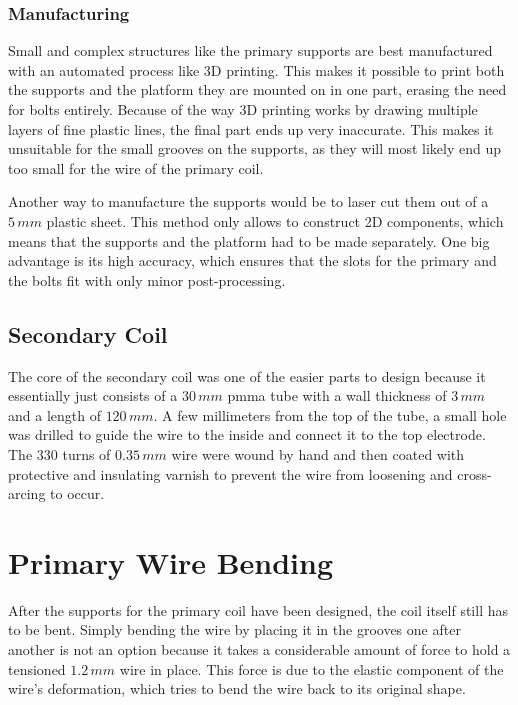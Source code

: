 \subsubsection{Manufacturing}

Small and complex structures like the primary supports are best manufactured with an automated process like 3D printing. This makes it possible to print both the supports and the platform they are mounted on in one part, erasing the need for bolts entirely. Because of the way 3D printing works by drawing multiple layers of fine plastic lines, the final part ends up very inaccurate. This makes it unsuitable for the small grooves on the supports, as they will most likely end up too small for the wire of the primary coil. 

Another way to manufacture the supports would be to laser cut them out of a \(5\,mm\) plastic sheet. This method only allows to construct 2D components, which means that the supports and the platform had to be made separately. One big advantage is its high accuracy, which ensures that the slots for the primary and the bolts fit with only minor post-processing. 

\subsection{Secondary Coil}

The core of the secondary coil was one of the easier parts to design because it essentially just consists of a \(30\,mm\) \gls{pmma} tube with a wall thickness of \(3\,mm\) and a length of \(120\,mm\). A few millimeters from the top of the tube, a small hole was drilled to guide the wire to the inside and connect it to the top electrode. The \(330\) turns of \(0.35\,mm\) wire were wound by hand and then coated with protective and insulating varnish to prevent the wire from loosening and cross-arcing to occur.

\section{Primary Wire Bending}

After the supports for the primary coil have been designed, the coil itself still has to be bent. Simply bending the wire by placing it in the grooves one after another is not an option because it takes a considerable amount of force to hold a tensioned \(1.2\,mm\) wire in place. 
This force is due to the elastic component of the wire's deformation, which tries to bend the wire back to its original shape. 

